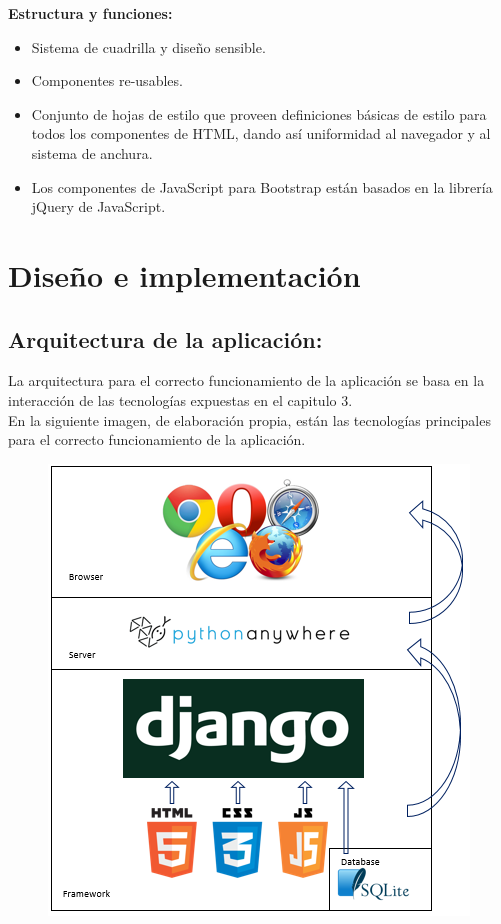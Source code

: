 \documentclass[a4paper, 12pt]{book}
\begin{document}
\textbf{Estructura y funciones: }\
\begin{itemize}
\item Sistema de cuadrilla y diseño sensible.
\item Componentes re-usables.
\item Conjunto de hojas de estilo que proveen definiciones básicas de estilo para todos los componentes de HTML, dando así uniformidad al navegador y al sistema de anchura.
\item Los componentes de JavaScript para Bootstrap están basados en la librería jQuery de JavaScript.
\end{itemize}



\cleardoublepage
\chapter{Diseño e implementación}
\section{Arquitectura de la aplicación: } 
La arquitectura para el correcto funcionamiento de la aplicación se basa en la interacción de las tecnologías expuestas en el capitulo 3. \\
En la siguiente imagen, de elaboración propia, están las tecnologías principales para el correcto funcionamiento de la aplicación.
\begin{figure}[hbtp]
\centering
\includegraphics[scale=0.8]{img/arquitectura.png} 
\end{figure}
\end{document}
